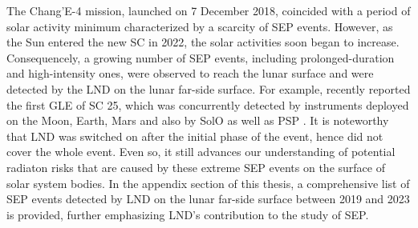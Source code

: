 


The Chang'E-4 mission, launched on 7 December 2018, coincided with a period of solar activity minimum characterized by a scarcity of \ac{SEP} events. However, as the Sun entered the new \acl{SC} in 2022, the solar activities soon began to increase. Consequencely, a growing number of \ac{SEP} events, including prolonged-duration and high-intensity ones, were observed to reach the lunar surface and were detected by the \ac{LND} on the lunar far-side surface. For example, \citet{Guo2023GRL} recently reported the first \ac{GLE} of \ac{SC} 25, which was concurrently detected by instruments deployed on the Moon, Earth, Mars and also by \ac{SolO} as well as \ac{PSP} \citep{Papaioannou2022AA, Martucci2023SpWea, Chertok2022MNRAS}. It is noteworthy that \ac{LND} was switched on after the initial phase of the event, hence did not cover the whole event. Even so, it still advances our understanding of potential radiaton risks that are caused by these extreme \ac{SEP} events on the surface of solar system bodies.
In the appendix section of this thesis, a comprehensive list of \ac{SEP} events detected by \ac{LND} on the lunar far-side surface between 2019 and 2023 is provided, further emphasizing \ac{LND}'s contribution to the study of \acs{SEP}.


